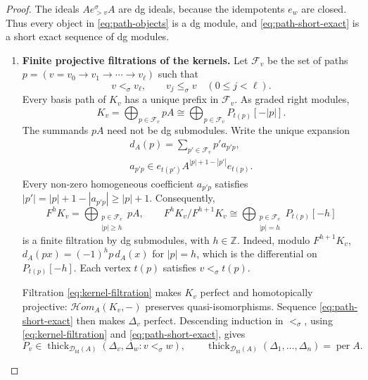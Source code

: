 \documentclass[11pt,a4paper]{article}
\newcommand{\D}{\mathcal D}
\newcommand{\ZZ}{\mathbb{Z}}
\newcommand{\std}{\Delta}
\newcommand{\dgHom}{\mathcal{H}\!om}
\DeclareMathOperator{\fd}{fd}
\DeclareMathOperator{\thick}{thick}
\DeclareMathOperator{\per}{per}
\theoremstyle{plain}
\theoremstyle{definition}
\numberwithin{equation}{section}
\begin{document}
\begin{proof}
The ideals $Ae_{>v}^{\sigma}A$ are dg ideals, because the idempotents
$e_w$ are closed. Thus every object in \eqref{eq:path-objects} is a dg
module, and \eqref{eq:path-short-exact} is a short exact sequence of dg
modules.

\begin{enumerate}[label=\textbf{\arabic*.},ref=\arabic*]
\item\label{step:kernels}
\textbf{Finite projective filtrations of the kernels.}
Let $\mathcal F_v$ be the set of paths
$p=(v=v_0\to v_1\to\cdots\to v_\ell)$ such that
\[
 v<_\sigma v_\ell,\qquad
 v_j\leq_\sigma v\quad(0\leq j<\ell).
\]
Every basis path of $K_v$ has a unique prefix in $\mathcal F_v$.
As graded right modules,
\begin{equation}\label{eq:graded-kernel}
 K_v=\bigoplus_{p\in\mathcal F_v}pA
       \cong\bigoplus_{p\in\mathcal F_v}P_{t(p)}[-|p|].
\end{equation}
The summands $pA$ need not be dg submodules.
Write the unique expansion
\begin{equation}\label{eq:generator-differential}
 \begin{gathered}
 d_A(p)=\sum_{p'\in\mathcal F_v}p'a_{p'p},\\
 a_{p'p}\in e_{t(p')}A^{|p|+1-|p'|}e_{t(p)}.
 \end{gathered}
\end{equation}
Every non-zero homogeneous coefficient $a_{p'p}$ satisfies
$|p'|=|p|+1-|a_{p'p}|\geq |p|+1$.
Consequently,
\begin{equation}\label{eq:kernel-filtration}
 F^hK_v=\bigoplus_{\substack{p\in\mathcal F_v\\|p|\geq h}}pA,
 \qquad
 F^hK_v/F^{h+1}K_v
 \cong\bigoplus_{\substack{p\in\mathcal F_v\\|p|=h}}P_{t(p)}[-h]
\end{equation}
is a finite filtration by dg submodules, with $h\in\ZZ$.
Indeed, modulo $F^{h+1}K_v$,
$d_A(px)=(-1)^h p\,d_A(x)$ for $|p|=h$, which is the differential
on $P_{t(p)}[-h]$. Each vertex $t(p)$ satisfies $v<_\sigma t(p)$.

Filtration \eqref{eq:kernel-filtration} makes $K_v$ perfect and
homotopically projective: $\dgHom_A(K_v,-)$ preserves
quasi-isomorphisms. Sequence \eqref{eq:path-short-exact} then makes
$\std_v$ perfect. Descending induction in $<_\sigma$, using
\eqref{eq:kernel-filtration} and \eqref{eq:path-short-exact}, gives
\begin{equation}\label{eq:perfect-generation}
 P_v\in\thick_{\D_{\fd}(A)}(\std_v,\std_w:v<_\sigma w),
 \qquad
 \thick_{\D_{\fd}(A)}(\std_1,\ldots,\std_n)=\per A.
\end{equation}


\end{enumerate}
\end{proof}
\end{document}
